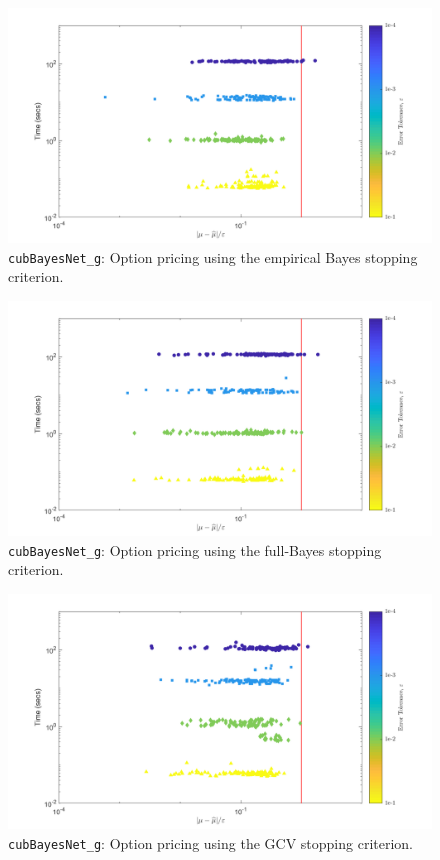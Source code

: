 \documentclass{iitthesis}          %
\newcommand{\code}[1]{\texttt{#1}}
\begin{document}
{{{{{{\begin{figure}
	\centering
	\includegraphics[width=0.95\linewidth]{"Sobol_optPrice_guaranteed_time_MLE__d12_r1_2019-Jun-10"}
	\caption[Sobol: Option pricing Guaranteed: MLE]{\code{cubBayesNet\_g}: Option pricing using the empirical Bayes stopping criterion.}
	\label{fig:Sobol-optprice-guaranteed-MLE}
\end{figure}
\begin{figure}
	\centering
	\includegraphics[width=0.95\linewidth]{"Sobol_optPrice_guaranteed_time_full__d12_r1_2019-Jun-10"}
	\caption[Sobol: Option pricing Guaranteed: Full Bayes]{\code{cubBayesNet\_g}: Option pricing using the full-Bayes stopping criterion.}
	\label{fig:Sobol-optprice-guaranteed-FB}
\end{figure}
\begin{figure}
	\centering
	\includegraphics[width=0.95\linewidth]{"Sobol_optPrice_guaranteed_time_GCV__d12_r1_2019-Jun-10"}
	\caption[Sobol: Option pricing Guaranteed: GCV]{\code{cubBayesNet\_g}: Option pricing using the GCV stopping criterion.}
	\label{fig:Sobol-optprice-guaranteed-GCV}
\end{figure}


}}}}}}
\end{document}
